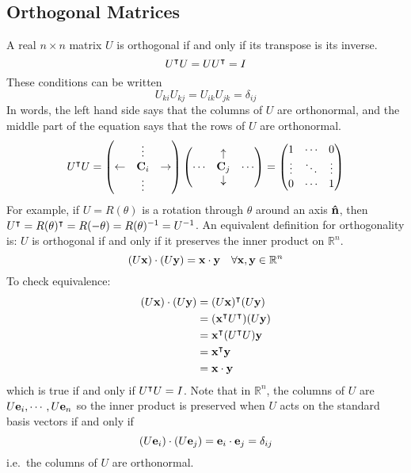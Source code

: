 \subsection{Orthogonal Matrices}
A real \(n \times n\) matrix \(U\) is orthogonal if and only if its transpose is its inverse.
\[
	U^\intercal U = UU^\intercal = I
\]
These conditions can be written
\[
	U_{ki}U_{kj} = U_{ik}U_{jk} = \delta_{ij}
\]
In words, the left hand side says that the columns of \(U\) are orthonormal, and the middle part of the equation says that the rows of \(U\) are orthonormal.
\[
	U^\intercal U = \begin{pmatrix}
		           & \vdots  &             \\
		\leftarrow & \vb C_i & \rightarrow \\
		           & \vdots  & 
	\end{pmatrix}
	\begin{pmatrix}
		       & \uparrow   &        \\
		\cdots & \vb C_j    & \cdots \\
		       & \downarrow & 
	\end{pmatrix}
	= \begin{pmatrix}
		1      & \cdots & 0      \\
		\vdots & \ddots & \vdots \\
		0      & \cdots & 1
	\end{pmatrix}
\]
For example, if \(U = R(\theta)\) is a rotation through \(\theta\) around an axis \(\vu{n}\), then \(U^\intercal = R(\theta)^\intercal = R(-\theta) = R(\theta)^{-1} = U^{-1}\).
An equivalent definition for orthogonality is: \(U\) is orthogonal if and only if it preserves the inner product on \(\mathbb R^n\).
\[
	(U\vb x)\cdot(U \vb y) = \vb x \cdot \vb y\quad \forall \vb x, \vb y \in \mathbb R^n
\]
To check equivalence:
\begin{align*}
	(U\vb x)\cdot(U \vb y) & = (U\vb x)^\intercal (U\vb y)             \\
	                       & = (\vb x^\intercal U^\intercal) (U\vb y) \\
	                       & = \vb x^\intercal (U^\intercal U) \vb y  \\
	                       & = \vb x^\intercal \vb y                   \\
	                       & = \vb x \cdot \vb y
\end{align*}
which is true if and only if \(U^\intercal U = I\).
Note that in \(\mathbb R^n\), the columns of \(U\) are \(U\vb e_i, \cdots, U\vb e_n\) so the inner product is preserved when \(U\) acts on the standard basis vectors if and only if
\[
	(U\vb e_i)\cdot(U\vb e_j) = \vb e_i \cdot \vb e_j = \delta_{ij}
\]
i.e.\ the columns of \(U\) are orthonormal.

